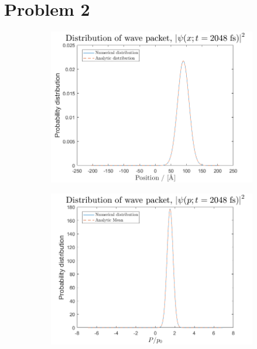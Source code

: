 \section*{Problem 2}

\begin{figure}[H]
\centering
\begin{subfigure}[t]{0.7\textwidth}
\includegraphics[width=\textwidth]{graphics/Task2/position.png}
\caption{}
\label{fig:2_a}
\end{subfigure}

\begin{subfigure}[t]{0.7\textwidth}
\includegraphics[width=\textwidth]{graphics/Task2/momentum.png}
\caption{}
\label{fig:2_b}
\end{subfigure}


\end{figure}
